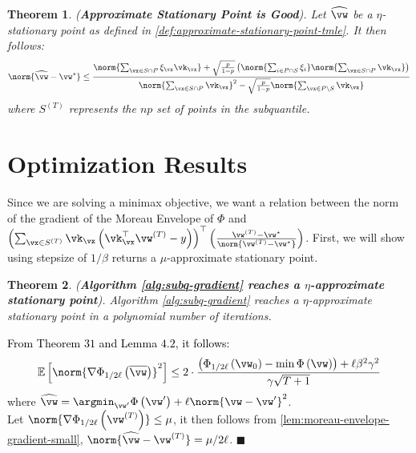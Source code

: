 \documentclass{article} %
\theoremstyle{plain}
\newtheorem{thm}{Theorem}
\theoremstyle{definition}
\theoremstyle{remark}
\newcommand{\ccref}[1]{\textcolor{black}{\cref{#1}}}
\begin{document}
	\begin{thm}
		\label{thm:approximate-stationary-point-is-good}
		(\textbf{Approximate Stationary Point is Good}). Let $\widehat{\vw}$ be a $\eta$-stationary point as defined in \ccref{def:approximate-stationary-point-tmle}. It then follows:
		\begin{equation}
			\norm{\widehat{\vw} - \vw^{\star}} \leq \frac{\norm{\sum_{\vx \in S \cap P}\xi_\vx \vk_\vx} + \sqrt{\frac{p}{1-p}}\left(\norm{\sum_{i \in P\cap S}\xi_i}\norm{\sum_{\vx \in S \cap P}\vk_\vx}\right)}{\norm{\sum_{\vx \in S \cap P}\vk_\vx}^2 - \sqrt{\frac{p}{1-p}}\norm{\sum_{\vx \in P\setminus S}\vk_\vx}}
		\end{equation} where $S^{(T)}$ represents the $np$ set of points in the subquantile.
	\end{thm}
	\fi
	
	
	\section{Optimization Results}
	Since we are solving a minimax objective, we want a relation between the norm of the gradient of the Moreau Envelope of $\Phi$ and $\left(\sum_{\vx \in S^{(T)}} \vk_{\vx}\left(\vk_{\vx}^\top \vw^{(T)} - y\right)\right)^\top\left(\frac{\vw^{(T)} - \vw^{\star}}{\norm{\vw^{(T)}-\vw^{\star}}}\right)$. 
	First, we will show using stepsize of $1/\beta$ returns a $\mu$-approximate stationary point.
	\begin{thm}
		(\textbf{Algorithm \ccref{alg:subq-gradient} reaches a $\eta$-approximate stationary point}). Algorithm \ccref{alg:subq-gradient} reaches a $\eta$-approximate stationary point in a polynomial number of iterations. 
	\end{thm}
		\textcolor{black}{From \citep{lin2020} Theorem $31$ and \citep{cheng:2020} Lemma $4.2$, it follows:}
		\begin{equation}
			\mathbb{E}\left[\norm{\nabla\Phi_{1/2\ell}\left(\overline{\vw}\right)}^2\right] \leq 2 \cdot \frac{\left(\Phi_{1/2\ell}\left(\vw_0\right) - \min\Phi\left(\vw\right)\right) + \ell \beta^2 \gamma^2}{\gamma\sqrt{T+1}}
		\end{equation} where $\widehat{\vw} = \argmin_{\vw'}\Phi\left(\vw'\right) + \ell\norm{\vw - \vw'}^2$.\\
		Let $\norm{\nabla\Phi_{1/2\ell}\left(\vw^{(T)}\right)} \leq \mu$, it then follows from \ccref{lem:moreau-envelope-gradient-small}, $\norm{\widehat{\vw}-\vw^{(T)}} = \mu/2\ell$. 
	\hfill $\blacksquare$
	
\end{document}
